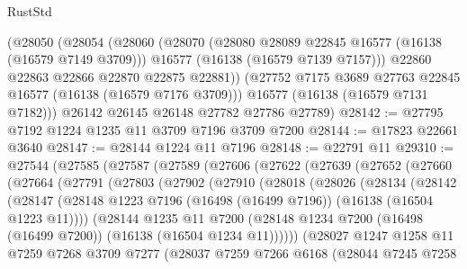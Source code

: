 \begin{lexlean}{RustStd}
\begin{coremodule}
      (@28050
        (@28054
          (@28060
            (@28070
              (@28080 @28089 @22845 @16577 (@16138 (@16579 @7149 @3709)))
              @16577
              (@16138 (@16579 @7139 @7157)))
            @22860
            @22863
            @22866
            @22870
            @22875
            @22881))
        (@27752 @7175 @3689 @27763 @22845 @16577 (@16138 (@16579 @7176 @3709)))
        @16577
        (@16138 (@16579 @7131 @7182)))
      @26142
      @26145
      @26148
      @27782
      @27786
      @27789)
@28142 := @27795 @7192 @1224 @1235 @11 @3709 @7196 @3709 @7200
@28144 := @17823 @22661 @3640
@28147 := @28144 @1224 @11 @7196
@28148 := @22791 @11
@29310 := @27544
    (@27585
      (@27587
        (@27589
          (@27606
            (@27622
              (@27639
                (@27652
                  (@27660
                    (@27664
                      (@27791
                        (@27803
                          (@27902
                            (@27910
                              (@28018
                                (@28026
                                  (@28134
                                    (@28142
                                      (@28147
                                        (@28148
                                          @1223
                                          @7196
                                          (@16498 (@16499 @7196))
                                          (@16138 (@16504 @1223 @11))))
                                      (@28144
                                        @1235
                                        @11
                                        @7200
                                        (@28148
                                          @1234
                                          @7200
                                          (@16498 (@16499 @7200))
                                          (@16138 (@16504 @1234 @11))))))
                                  (@28027
                                    @1247
                                    @1258
                                    @11
                                    @7259
                                    @7268
                                    @3709
                                    @7277
                                    (@28037
                                      @7259
                                      @7266
                                      @6168
                                      (@28044
                                        @7245
                                        @7258

\end{coremodule}
\end{lexlean}

